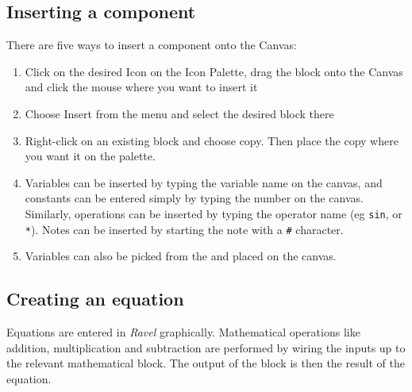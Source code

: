 \subsection{Inserting a component}

There are five ways to insert a component onto the Canvas: 
\begin{enumerate}
\item Click on the desired Icon on the Icon Palette, drag the block onto
the Canvas and click the mouse where you want to insert it
\begin{center}
\par\end{center}
\item Choose Insert from the menu and select the desired block there


\begin{center}
 
\par\end{center}

\newpage{}
\item Right-click on an existing block and choose copy. Then place the copy
where you want it on the palette.
\begin{center}
\par\end{center}
\item Variables can be inserted by typing the variable name on the canvas,
and constants can be entered simply by typing the number on the canvas.
Similarly, operations can be inserted by typing the operator name
(eg \verb+sin+, or \verb+*+). Notes can be inserted by starting
the note with a \verb+#+ character.
\item Variables can also be picked from the 
and placed on the canvas. 
\end{enumerate}

\subsection{Creating an equation}

Equations are entered in \emph{Ravel} graphically. Mathematical operations
like addition, multiplication and subtraction are performed by wiring
the inputs up to the relevant mathematical block. The output of the
block is then the result of the equation.

